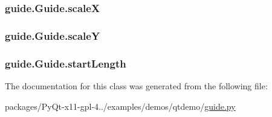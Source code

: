 \subsubsection[{scale\+X}]{\setlength{\rightskip}{0pt plus 5cm}guide.\+Guide.\+scale\+X}\label{classguide_1_1Guide_a362ff57bf1a3502084208f0f1446f9ba}
\hypertarget{classguide_1_1Guide_a4d1924fb7147eaad7564187c37c2291f}{}
\subsubsection[{scale\+Y}]{\setlength{\rightskip}{0pt plus 5cm}guide.\+Guide.\+scale\+Y}\label{classguide_1_1Guide_a4d1924fb7147eaad7564187c37c2291f}
\hypertarget{classguide_1_1Guide_a875a7b9b5547b3082c2b13dd94e62e4f}{}
\subsubsection[{start\+Length}]{\setlength{\rightskip}{0pt plus 5cm}guide.\+Guide.\+start\+Length}\label{classguide_1_1Guide_a875a7b9b5547b3082c2b13dd94e62e4f}


The documentation for this class was generated from the following file\+:\begin{DoxyCompactItemize}
\item 
packages/\+Py\+Qt-\/x11-\/gpl-\/4../examples/demos/qtdemo/\hyperlink{guide_8py}{guide.\+py}\end{DoxyCompactItemize}
